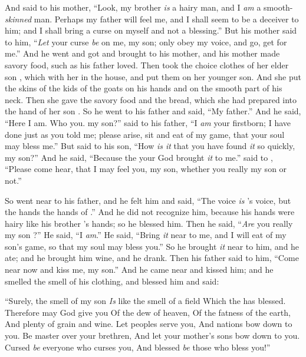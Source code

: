 \bverse And \Jacob said to \Rebekah his mother, ``Look, \Esau my brother \textit{is} a hairy man, and I \textit{am} a smooth-\textit{skinned} man.
\bverse Perhaps my father will feel me, and I shall seem to be a deceiver to him; and I shall bring a curse on myself and not a blessing.''
	\bverse But his mother said to him, ``\textit{Let} your curse \textit{be} on me, my son; only obey my voice, and go, get \them for me.''
\bverse And he went and got \them and brought \them to his mother, and his mother made savory food, such as his father loved.
\bverse Then \Rebekah took the choice clothes of her elder son \Esau, which \were with her in the house, and put them on \Jacob her younger son.
\bverse And she put the skins of the kids of the goats on his hands and on the smooth part of his neck.
\bverse Then she gave the savory food and the bread, which she had prepared into the hand of her son \Jacob.
\bverse So he went to his father and said, ``My father.'' And he said, ``Here I am. Who \are you. my son?''
\bverse \Jacob said to his father, ``I \textit{am} \Esau your firstborn; I have done just as you told me; please arise, sit and eat of my game, that your soul may bless me.''
\bverse But \Isaac said to his son, ``How \textit{is it} that you have found \textit{it} so quickly, my son?'' And he said, ``Because the \lord your God brought \textit{it} to me.''
\bverse \Isaac said to \Jacob, ``Please come hear, that I may feel you, my son, whether you \are really my son  or not.''


\bverse So \Jacob went near to \Isaac his father, and he felt him and said, ``The voice \textit{is} \Jacob's voice, but the hands \are the hands of \Esau.''
\bverse And he did not recognize him, because his hands were hairy like his brother \Esau's hands; so he blessed him.
\bverse Then he said, ``\textit{Are} you really my son \Esau?'' He said, ``I \textit{am}.''
\bverse He said, ``Bring \textit{it} near to me, and I will eat of my son's game, so that my soul may bless you.'' So he brought \textit{it} near to him, and he ate; and he brought him wine, and he drank.
\bverse Then his father \Isaac said to him, ``Come near now and kiss me, my son.''
\bverse And he came near and kissed him; and he smelled the smell of his clothing, and blessed him and said:
\begin{bquotation}
``Surely, the smell of my son \textit{Is} like the smell of a field Which the \lord has blessed. \bverse Therefore may God give you Of the dew of heaven, Of the fatness of the earth, And plenty of grain and wine. \bverse Let peoples serve you, And nations bow down to you. Be master over your brethren, And let your mother's sons bow down to you. Cursed \textit{be} everyone who curses you, And blessed \textit{be} those who bless you!''
\end{bquotation}

